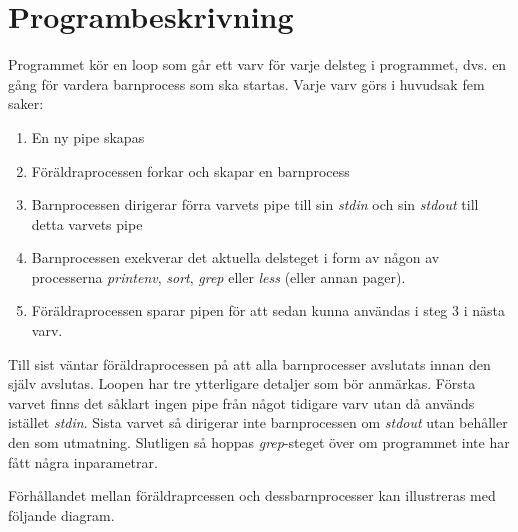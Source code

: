 \documentclass[10pt,a4paper]{article}
\begin{document}
\section{Programbeskrivning}

Programmet kör en loop som går ett varv för varje delsteg i programmet, dvs. en gång för vardera barnprocess som ska startas. Varje varv görs i huvudsak fem saker:

\begin{enumerate}
\item En ny pipe skapas
\item Föräldraprocessen forkar och skapar en barnprocess
\item Barnprocessen dirigerar förra varvets pipe till sin \emph{stdin} och sin \emph{stdout} till detta varvets pipe
\item Barnprocessen exekverar det aktuella delsteget i form av någon av processerna \emph{printenv}, \emph{sort}, \emph{grep} eller \emph{less} (eller annan pager).
\item Föräldraprocessen sparar pipen för att sedan kunna användas i steg 3 i nästa varv.
\end{enumerate}

Till sist väntar föräldraprocessen på att alla barnprocesser avslutats innan den själv avslutas. Loopen har tre ytterligare detaljer som bör anmärkas. Första varvet finns det såklart ingen pipe från något tidigare varv utan då används istället \emph{stdin}. Sista varvet så dirigerar inte barnprocessen om \emph{stdout} utan behåller den som utmatning. Slutligen så hoppas \emph{grep}-steget över om programmet inte har fått några inparametrar.

Förhållandet mellan föräldraprcessen och dessbarnprocesser kan illustreras med följande diagram.

\end{document}
